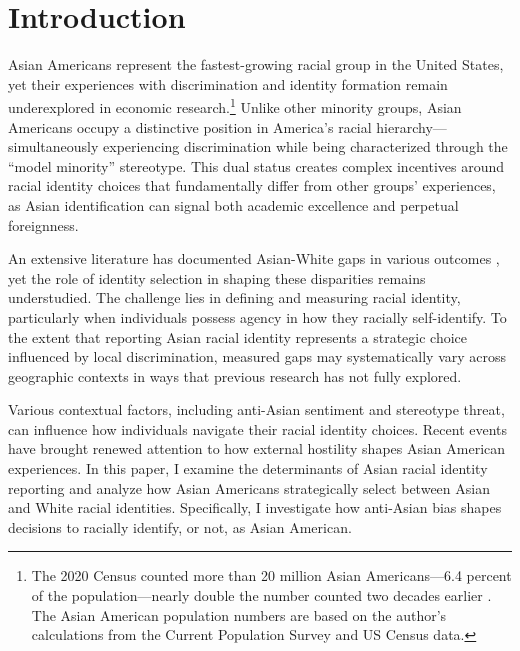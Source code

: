
\section{Introduction}\label{sec:intro}

Asian Americans represent the fastest-growing racial group in the United States, yet their experiences with discrimination and identity formation remain underexplored in economic research.\footnote{The 2020 Census counted more than 20 million Asian Americans---6.4 percent of the population---nearly double the number counted two decades earlier \autocite{floodsarahIntegratedPublicUse2021a}. The Asian American population numbers are based on the author's calculations from the Current Population Survey and US Census data.} Unlike other minority groups, Asian Americans occupy a distinctive position in America's racial hierarchy—simultaneously experiencing discrimination while being characterized through the ``model minority'' stereotype. This dual status creates complex incentives around racial identity choices that fundamentally differ from other groups' experiences, as Asian identification can signal both academic excellence and perpetual foreignness.

An extensive literature has documented Asian-White gaps in various outcomes \autocite{chiswick1983analysis, duleep2012economic, hilger2016upward, arabsheibani2010asian}, yet the role of identity selection in shaping these disparities remains understudied. The challenge lies in defining and measuring racial identity, particularly when individuals possess agency in how they racially self-identify. To the extent that reporting Asian racial identity represents a strategic choice influenced by local discrimination, measured gaps may systematically vary across geographic contexts in ways that previous research has not fully explored.

Various contextual factors, including anti-Asian sentiment and stereotype threat, can influence how individuals navigate their racial identity choices. Recent events have brought renewed attention to how external hostility shapes Asian American experiences. In this paper, I examine the determinants of Asian racial identity reporting and analyze how Asian Americans strategically select between Asian and White racial identities. Specifically, I investigate how anti-Asian bias shapes decisions to racially identify, or not, as Asian American.

